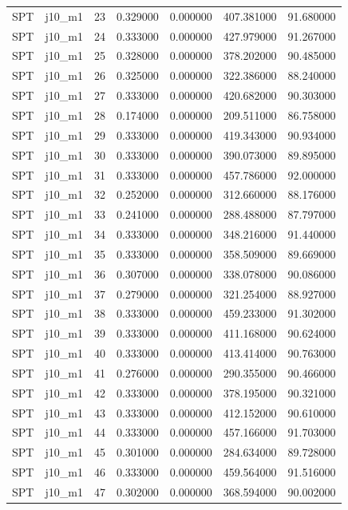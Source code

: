 \begin{tabular}{llrrrrr}
SPT & j10_m1 & 23 & 0.329000 & 0.000000 & 407.381000 & 91.680000 \\
SPT & j10_m1 & 24 & 0.333000 & 0.000000 & 427.979000 & 91.267000 \\
SPT & j10_m1 & 25 & 0.328000 & 0.000000 & 378.202000 & 90.485000 \\
SPT & j10_m1 & 26 & 0.325000 & 0.000000 & 322.386000 & 88.240000 \\
SPT & j10_m1 & 27 & 0.333000 & 0.000000 & 420.682000 & 90.303000 \\
SPT & j10_m1 & 28 & 0.174000 & 0.000000 & 209.511000 & 86.758000 \\
SPT & j10_m1 & 29 & 0.333000 & 0.000000 & 419.343000 & 90.934000 \\
SPT & j10_m1 & 30 & 0.333000 & 0.000000 & 390.073000 & 89.895000 \\
SPT & j10_m1 & 31 & 0.333000 & 0.000000 & 457.786000 & 92.000000 \\
SPT & j10_m1 & 32 & 0.252000 & 0.000000 & 312.660000 & 88.176000 \\
SPT & j10_m1 & 33 & 0.241000 & 0.000000 & 288.488000 & 87.797000 \\
SPT & j10_m1 & 34 & 0.333000 & 0.000000 & 348.216000 & 91.440000 \\
SPT & j10_m1 & 35 & 0.333000 & 0.000000 & 358.509000 & 89.669000 \\
SPT & j10_m1 & 36 & 0.307000 & 0.000000 & 338.078000 & 90.086000 \\
SPT & j10_m1 & 37 & 0.279000 & 0.000000 & 321.254000 & 88.927000 \\
SPT & j10_m1 & 38 & 0.333000 & 0.000000 & 459.233000 & 91.302000 \\
SPT & j10_m1 & 39 & 0.333000 & 0.000000 & 411.168000 & 90.624000 \\
SPT & j10_m1 & 40 & 0.333000 & 0.000000 & 413.414000 & 90.763000 \\
SPT & j10_m1 & 41 & 0.276000 & 0.000000 & 290.355000 & 90.466000 \\
SPT & j10_m1 & 42 & 0.333000 & 0.000000 & 378.195000 & 90.321000 \\
SPT & j10_m1 & 43 & 0.333000 & 0.000000 & 412.152000 & 90.610000 \\
SPT & j10_m1 & 44 & 0.333000 & 0.000000 & 457.166000 & 91.703000 \\
SPT & j10_m1 & 45 & 0.301000 & 0.000000 & 284.634000 & 89.728000 \\
SPT & j10_m1 & 46 & 0.333000 & 0.000000 & 459.564000 & 91.516000 \\
SPT & j10_m1 & 47 & 0.302000 & 0.000000 & 368.594000 & 90.002000 \\

\end{tabular}
